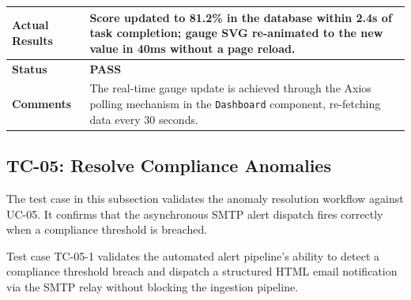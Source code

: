 \begin{table}[H]
{\begin{tabular}{|>{\raggedright\arraybackslash\bfseries}p{4.5cm}|>{\raggedright\arraybackslash}p{11.5cm}|}
        Actual Results & Score updated to 81.2\% in the database within 2.4s of task completion; gauge SVG re-animated to the new value in 40ms without a page reload. \\ \hline
        Status & \textcolor{green!60!black}{\textbf{PASS}} \\ \hline
        Comments & The real-time gauge update is achieved through the Axios polling mechanism in the \texttt{Dashboard} component, re-fetching data every 30 seconds. \\ \hline
    \end{tabular}
    }
\end{table}

\subsection{TC-05: Resolve Compliance Anomalies}
The test case in this subsection validates the anomaly resolution workflow against UC-05. It confirms that the asynchronous SMTP alert dispatch fires correctly when a compliance threshold is breached.

Test case TC-05-1 validates the automated alert pipeline's ability to detect a compliance threshold breach and dispatch a structured HTML email notification via the SMTP relay without blocking the ingestion pipeline.

